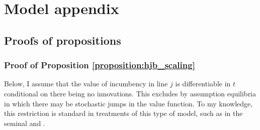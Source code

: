 \documentclass[ecta,nameyear,final]{econsocart}
\theoremstyle{definition}
\begin{document}
\section{Model appendix}\label{appendix:model}

\subsection{Proofs of propositions}

\subsubsection{Proof of Proposition \ref{proposition:hjb_scaling}}\label{appendix:proofs:proposition:hjb_scaling}

Below, I assume that the value of incumbency in line $j$ is differentiable in $t$ conditional on there being no innovations. This excludes by assumption equilibria in which there may be stochastic jumps in the value function. To my knowledge, this restriction is standard in treatments of this type of model, such as in the seminal \cite{grossman_quality_1991} and \cite{acemoglu_introduction_2009}.
\end{document}
